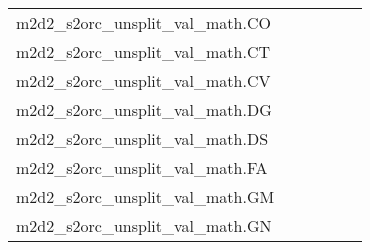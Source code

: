 {\begin{longtable}{m{6cm}m{1.7cm}m{1.7cm}m{1.7cm}m{1.7cm}m{1.7cm}}
	m2d2\_s2orc\_unsplit\_val\_math.CO  & \colorbox[HTML]{77c578}{\makebox[\mywidth][c]{6.99}} & \colorbox[HTML]{edf8b2}{\makebox[\mywidth][c]{7.33}} & \colorbox[HTML]{ffffe5}{\makebox[\mywidth][c]{8.69}} & \colorbox[HTML]{d8efa2}{\makebox[\mywidth][c]{7.21}} & \colorbox[HTML]{acdc8d}{\makebox[\mywidth][c]{7.08}}\\
	m2d2\_s2orc\_unsplit\_val\_math.CT  & \colorbox[HTML]{77c578}{\makebox[\mywidth][c]{9.78}} & \colorbox[HTML]{e9f6af}{\makebox[\mywidth][c]{10.20}} & \colorbox[HTML]{ffffe5}{\makebox[\mywidth][c]{12.04}} & \colorbox[HTML]{dff2a7}{\makebox[\mywidth][c]{10.12}} & \colorbox[HTML]{aadc8d}{\makebox[\mywidth][c]{9.91}}\\
	m2d2\_s2orc\_unsplit\_val\_math.CV  & \colorbox[HTML]{77c578}{\makebox[\mywidth][c]{7.81}} & \colorbox[HTML]{e5f4ab}{\makebox[\mywidth][c]{8.07}} & \colorbox[HTML]{ffffe5}{\makebox[\mywidth][c]{9.36}} & \colorbox[HTML]{d0ec9e}{\makebox[\mywidth][c]{7.99}} & \colorbox[HTML]{9ad486}{\makebox[\mywidth][c]{7.87}}\\
	m2d2\_s2orc\_unsplit\_val\_math.DG  & \colorbox[HTML]{77c578}{\makebox[\mywidth][c]{7.96}} & \colorbox[HTML]{def2a6}{\makebox[\mywidth][c]{8.18}} & \colorbox[HTML]{ffffe5}{\makebox[\mywidth][c]{9.50}} & \colorbox[HTML]{bae294}{\makebox[\mywidth][c]{8.08}} & \colorbox[HTML]{81c97c}{\makebox[\mywidth][c]{7.98}}\\
	m2d2\_s2orc\_unsplit\_val\_math.DS  & \colorbox[HTML]{77c578}{\makebox[\mywidth][c]{7.88}} & \colorbox[HTML]{dcf1a5}{\makebox[\mywidth][c]{8.12}} & \colorbox[HTML]{ffffe5}{\makebox[\mywidth][c]{9.61}} & \colorbox[HTML]{d3eda0}{\makebox[\mywidth][c]{8.08}} & \colorbox[HTML]{a4d98a}{\makebox[\mywidth][c]{7.96}}\\
	m2d2\_s2orc\_unsplit\_val\_math.FA  & \colorbox[HTML]{77c578}{\makebox[\mywidth][c]{7.71}} & \colorbox[HTML]{e1f3a9}{\makebox[\mywidth][c]{7.96}} & \colorbox[HTML]{ffffe5}{\makebox[\mywidth][c]{9.35}} & \colorbox[HTML]{cae99c}{\makebox[\mywidth][c]{7.88}} & \colorbox[HTML]{b0de8f}{\makebox[\mywidth][c]{7.81}}\\
	m2d2\_s2orc\_unsplit\_val\_math.GM  & \colorbox[HTML]{77c578}{\makebox[\mywidth][c]{7.85}} & \colorbox[HTML]{e6f5ad}{\makebox[\mywidth][c]{8.15}} & \colorbox[HTML]{ffffe5}{\makebox[\mywidth][c]{9.57}} & \colorbox[HTML]{d7efa2}{\makebox[\mywidth][c]{8.07}} & \colorbox[HTML]{a5d98b}{\makebox[\mywidth][c]{7.93}}\\
	m2d2\_s2orc\_unsplit\_val\_math.GN  & \colorbox[HTML]{77c578}{\makebox[\mywidth][c]{6.27}} & \colorbox[HTML]{eaf7af}{\makebox[\mywidth][c]{6.56}} & \colorbox[HTML]{ffffe5}{\makebox[\mywidth][c]{7.82}} & \colorbox[HTML]{d1ec9f}{\makebox[\mywidth][c]{6.45}} & \colorbox[HTML]{b7e193}{\makebox[\mywidth][c]{6.38}}\\

\end{longtable}}
